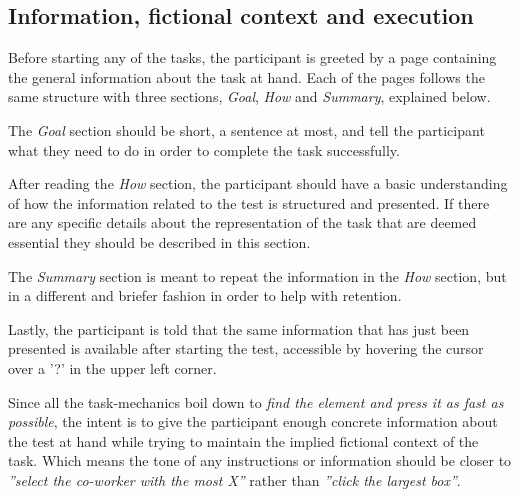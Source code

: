 {  \subsection{Information, fictional context and execution}

  Before starting any of the tasks, the participant is greeted by a page
  containing the general information about the task at hand. Each of the
  pages follows the same structure with three sections, \textit{Goal},
  \textit{How} and \textit{Summary}, explained below.

  The \textit{Goal} section should be short{\findref}, a sentence at
  most{\findref}, and tell the participant what they need to do in order
  to complete the task successfully.

  After reading the \textit{How} section, the participant should have a
  basic understanding of how the information related to the test is
  structured and presented. If there are any specific details about the
  representation of the task that are deemed essential they should be
  described in this section.

  The \textit{Summary} section is meant to repeat the information in the
  \textit{How} section, but in a different and briefer fashion in order
  to help with retention\findref.

  Lastly, the participant is told that the same information that has just
  been presented is available after starting the test, accessible by
  hovering the cursor over a '?' in the upper left corner.

  Since all the task-mechanics boil down to
  \textit{find the element and press it as fast as possible},
  the intent is to give the participant enough concrete
  information about the test at hand while trying to maintain the
  implied fictional context of the task. Which means the tone of any
  instructions or information should be closer to
  \textit{''select the co-worker with the most X''} rather than
  \textit{''click the largest box''}.


}
